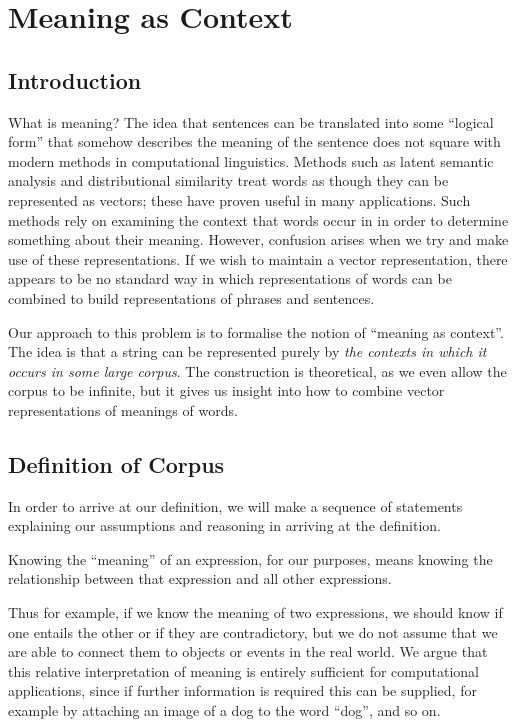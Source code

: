 \documentclass[12pt]{report}
\begin{document}
\chapter{Meaning as Context}


\section{Introduction}

What is meaning? The idea that sentences can be translated into some ``logical form'' that somehow describes the meaning of the sentence does not square with modern methods in computational linguistics. Methods such as latent semantic analysis and distributional similarity treat words as though they can be represented as vectors; these have proven useful in many applications. Such methods rely on examining the context that words occur in in order to determine something about their meaning. However, confusion arises when we try and make use of these representations. If we wish to maintain a vector representation, there appears to be no standard way in which representations of words can be combined to build representations of phrases and sentences.

Our approach to this problem is to formalise the notion of ``meaning as context''. The idea is that a string can be represented purely by \emph{the contexts in which it occurs in some large corpus}. The construction is theoretical, as we even allow the corpus to be infinite, but it gives us insight into how to combine vector representations of meanings of words.

\section{Definition of Corpus}

In order to arrive at our definition, we will make a sequence of statements explaining our assumptions and reasoning in arriving at the definition.
\begin{assumption} Knowing the ``meaning'' of an expression, for our purposes, means knowing the relationship between that expression and all other expressions.
\end{assumption} \noindent
Thus for example, if we know the meaning of two expressions, we should know if one entails the other or if they are contradictory, but we do not assume that we are able to connect them to objects or events in the real world. We argue that this relative interpretation of meaning is entirely sufficient for computational applications, since if further information is required this can be supplied, for example by attaching an image of a dog to the word ``dog'', and so on.
\end{document}
